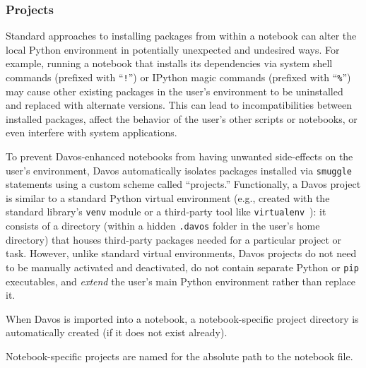 \documentclass[preprint,12pt,a4paper]{elsarticle}
\begin{document}
\subsubsection{Projects}\label{subsec:projects}

Standard approaches to installing packages from within a notebook can alter the local Python environment in potentially unexpected and undesired ways. For example, running a notebook that installs its dependencies via system shell commands (prefixed with ``\texttt{!}'') or IPython magic commands (prefixed with ``\texttt{\%}'') may cause other existing packages in the user's environment to be uninstalled and replaced with alternate versions. This can lead to incompatibilities between installed packages, affect the behavior of the user's other scripts or notebooks, or even interfere with system applications.

To prevent Davos-enhanced notebooks from having unwanted side-effects on the user's environment, Davos automatically isolates packages installed via \texttt{smuggle} statements using a custom scheme called ``projects.'' Functionally, a Davos project is similar to a standard Python virtual environment (e.g., created with the standard library's \texttt{venv} module or a third-party tool like \texttt{virtualenv}~\cite{BickEtal07}): it consists of a directory (within a hidden \texttt{.davos} folder in the user's home directory) that houses third-party packages needed for a particular project or task. However, unlike standard virtual environments, Davos projects do not need to be manually activated and deactivated, do not contain separate Python or \texttt{pip} executables, and \textit{extend} the user's main Python environment rather than replace it. 

When Davos is imported into a notebook, a notebook-specific project directory is automatically created (if it does not exist already). 


Notebook-specific projects are named for the absolute path to the notebook file. 


\end{document}
